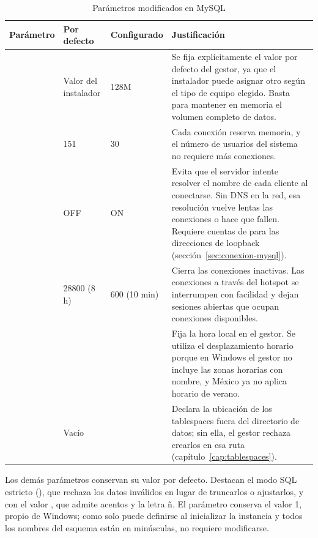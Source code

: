 \begin{table}[H]
	\centering
	\small
	\caption{Parámetros modificados en MySQL}
	\label{tab:parametros-mysql}
	\begin{tabular}{@{}L{3.4cm} L{1.9cm} L{2.5cm} L{7.6cm}@{}}
		\toprule
		\textbf{Parámetro} & \textbf{Por defecto} & \textbf{Configurado} & \textbf{Justificación} \\
		\midrule
		 & Valor del instalador & 128M & Se fija explícitamente el valor por defecto del gestor, ya que el instalador puede asignar otro según el tipo de equipo elegido. Basta para mantener en memoria el volumen completo de datos. \\
		 & 151 & 30 & Cada conexión reserva memoria, y el número de usuarios del sistema no requiere más conexiones. \\
		 & OFF & ON & Evita que el servidor intente resolver el nombre de cada cliente al conectarse. Sin DNS en la red, esa resolución vuelve lentas las conexiones o hace que fallen. Requiere cuentas de  para las direcciones de loopback (sección~\ref{sec:conexion-mysql}). \\
		 & 28800 (8 h) & 600 (10 min) & Cierra las	conexiones inactivas. Las conexiones a través del hotspot se interrumpen con facilidad y dejan sesiones abiertas que ocupan conexiones disponibles. \\
		 &  &  & Fija la	hora local en el gestor. Se utiliza el desplazamiento horario porque en	Windows el gestor no incluye las zonas horarias con nombre, y México ya no aplica horario de verano. \\
		 & Vacío &  & Declara la ubicación de los tablespaces fuera del directorio de datos; sin ella, el gestor rechaza crearlos en esa ruta (capítulo~\ref{cap:tablespaces}). \\
		\bottomrule
	\end{tabular}
\end{table}

Los demás parámetros conservan su valor por defecto. Destacan el modo SQL estricto (), que rechaza los datos inválidos en lugar de truncarlos o ajustarlos, y  con el valor , que admite acentos y la letra ñ. El parámetro  conserva el valor 1, propio de Windows; como solo puede definirse al inicializar la instancia y todos los nombres del esquema están en minúsculas, no requiere modificarse.


